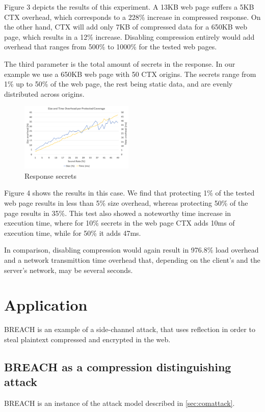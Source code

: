 \documentclass[conference, letterpaper, 10pt]{IEEEtran}
\begin{document}
Figure 3 depicts the results of this experiment. A 13KB web page suffers a 5KB
CTX overhead, which corresponds to a 228\% increase in compressed response. On the
other hand, CTX will add only 7KB of compressed data for a 650KB web page, which
results in a 12\% increase. Disabling compression entirely would add overhead
that ranges from 500\% to 1000\% for the tested web pages.

The third parameter is the total amount of secrets in the response. In our
example we use a 650KB web page with 50 CTX origins. The secrets range from 1\%
up to 50\% of the web page, the rest being static data, and are evenly
distributed across origins.

   \begin{figure}[thpb]
      \centering
      \includegraphics[width=0.48\textwidth]{experiments/response_secrets.png}
      \caption{Response secrets}
   \end{figure}

Figure 4 shows the results in this case. We find that protecting 1\% of the
tested web page results in less than 5\% size overhead, whereas protecting 50\% of
the page results in 35\%. This test also showed a noteworthy time increase in
execution time, where for 10\% secrets in the web page CTX adds 10ms of
execution time, while for 50\% it adds 47ms.

In comparison, disabling compression would again result in 976.8\% load overhead
and a network transmittion time overhead that, depending on the client's and the
server's network, may be several seconds.

\section{Application}\label{sec:application}

BREACH is an example of a side-channel attack, that uses reflection in
order to steal plaintext compressed and encrypted in the web.

\subsection{BREACH as a compression distinguishing
attack}\label{subsec:breachapp}
BREACH is an instance of the attack model described in \ref{sec:comattack}.
\end{document}
